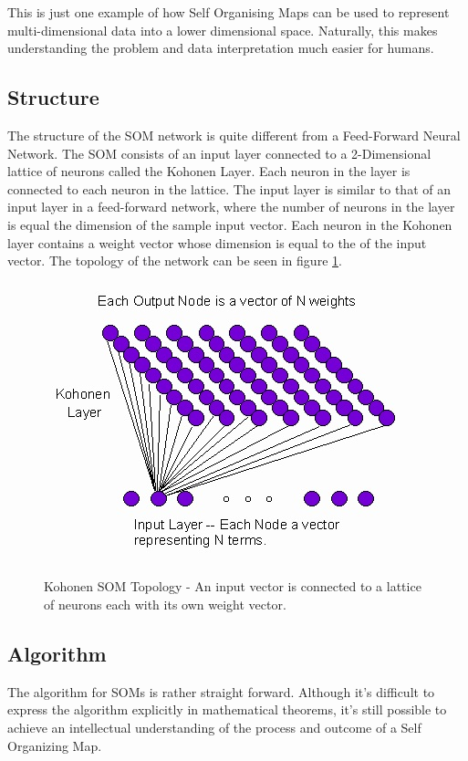 \documentclass{IEEEtran}
\begin{document}
		This is just one example of how Self Organising Maps can be used to represent multi-dimensional data into a lower dimensional space. Naturally, this makes understanding the problem and data interpretation much easier for humans.

 
\subsection{Structure}
The structure of the SOM network is quite different from a Feed-Forward Neural Network. The SOM consists of an input layer connected to a 2-Dimensional lattice of neurons called the Kohonen Layer. Each neuron in the layer is connected to each neuron in the lattice. The input layer is similar to that of an input layer in a feed-forward network, where the number of neurons in the layer is equal the dimension of the sample input vector. Each neuron in the Kohonen layer contains a weight vector whose dimension is equal to the of the input vector. The topology of the network can be seen in figure \ref{fig:somstructure}\cite{ascalablesomalg}.


\begin{figure}[!htbp]
\centering
\includegraphics[scale=0.50]{./images/som_structure.jpg}
	\caption{Kohonen SOM Topology - An input vector is connected to a lattice of neurons each with its own weight vector.}
\label{fig:somstructure} 
\end{figure}

\subsection{Algorithm}
The algorithm for SOMs is rather straight forward. Although it's difficult to express the algorithm explicitly in mathematical theorems, it's still possible to achieve an intellectual understanding of the process and outcome of a Self Organizing Map. \cite{thesom}
\end{document}
